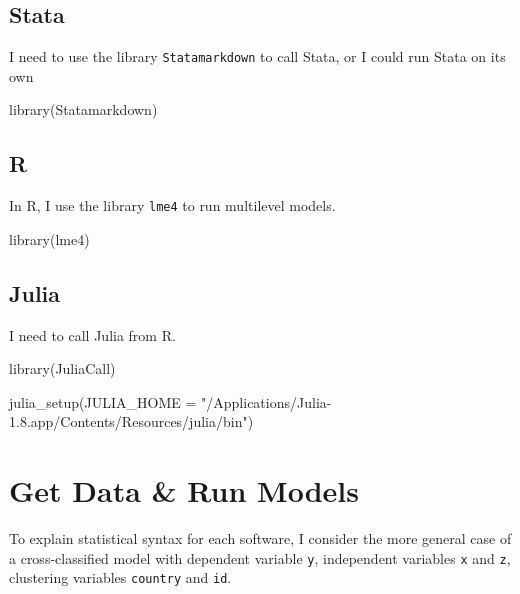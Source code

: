 \documentclass[
  letterpaper,
  DIV=11,
  numbers=noendperiod,
  oneside]{scrreprt}
\newenvironment{Shaded}{\begin{snugshade}}{\end{snugshade}}
\newcommand{\AttributeTok}[1]{\textcolor[rgb]{0.40,0.45,0.13}{#1}}
\newcommand{\FunctionTok}[1]{\textcolor[rgb]{0.28,0.35,0.67}{#1}}
\newcommand{\NormalTok}[1]{\textcolor[rgb]{0.00,0.23,0.31}{#1}}
\newcommand{\StringTok}[1]{\textcolor[rgb]{0.13,0.47,0.30}{#1}}
\begin{document}
\subsection{Stata}

I need to use the library \texttt{Statamarkdown} to call Stata, or I
could run Stata on its own

\begin{Shaded}
\begin{Highlighting}[]
\FunctionTok{library}\NormalTok{(Statamarkdown)}
\end{Highlighting}
\end{Shaded}

\subsection{R}

In R, I use the library \texttt{lme4} to run multilevel models.

\begin{Shaded}
\begin{Highlighting}[]
\FunctionTok{library}\NormalTok{(lme4)}
\end{Highlighting}
\end{Shaded}

\subsection{Julia}

I need to call Julia from R.

\begin{Shaded}
\begin{Highlighting}[]
\FunctionTok{library}\NormalTok{(JuliaCall)}

\FunctionTok{julia\_setup}\NormalTok{(}\AttributeTok{JULIA\_HOME =} \StringTok{"/Applications/Julia{-}1.8.app/Contents/Resources/julia/bin"}\NormalTok{)}
\end{Highlighting}
\end{Shaded}

\hypertarget{get-data-run-models-1}{%
\section{Get Data \& Run Models}\label{get-data-run-models-1}}

To explain statistical syntax for each software, I consider the more
general case of a cross-classified model with dependent variable
\texttt{y}, independent variables \texttt{x} and \texttt{z}, clustering
variables \texttt{country} and \texttt{id}.
\end{document}
